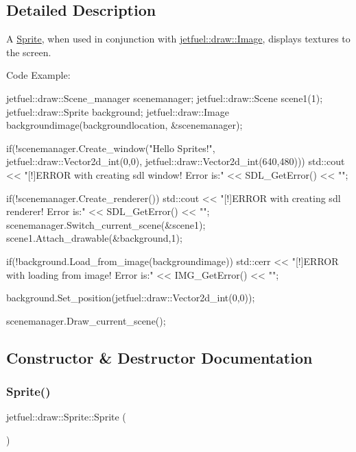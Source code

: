 \subsection{Detailed Description}
A \hyperlink{classjetfuel_1_1draw_1_1Sprite}{Sprite}, when used in conjunction with \hyperlink{classjetfuel_1_1draw_1_1Image}{jetfuel\+::draw\+::\+Image}, displays textures to the screen.

Code Example\+: \begin{DoxyVerb}jetfuel::draw::Scene_manager scenemanager;
jetfuel::draw::Scene scene1(1);
jetfuel::draw::Sprite background;
jetfuel::draw::Image backgroundimage(backgroundlocation,
                              &scenemanager);

if(!scenemanager.Create_window("Hello Sprites!",
                               jetfuel::draw::Vector2d_int(0,0),
                               jetfuel::draw::Vector2d_int(640,480))){
    std::cout << "[!]ERROR with creating sdl window! Error is:" <<
    SDL_GetError() << "\n";
}

if(!scenemanager.Create_renderer()){
    std::cout << "[!]ERROR with creating sdl renderer! Error is:" <<
    SDL_GetError() << "\n";
}
scenemanager.Switch_current_scene(&scene1);
scene1.Attach_drawable(&background,1);

if(!background.Load_from_image(backgroundimage)){
    std::cerr << "[!]ERROR with loading from image! Error is:" <<
    IMG_GetError() << "\n";
}

background.Set_position(jetfuel::draw::Vector2d_int(0,0));

scenemanager.Draw_current_scene();  \end{DoxyVerb}
 

\subsection{Constructor \& Destructor Documentation}
\mbox{\label{classjetfuel_1_1draw_1_1Sprite_a108a6509a5d4b86e69942788d4401213}} 
\subsubsection{\texorpdfstring{Sprite()}{Sprite()}}
{\footnotesize\ttfamily jetfuel\+::draw\+::\+Sprite\+::\+Sprite (\begin{DoxyParamCaption}{ }\end{DoxyParamCaption})}



